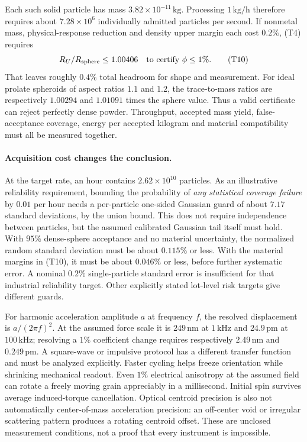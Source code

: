 \documentclass[11pt]{article}
\begin{document}
Each such solid particle has mass $3.82\times10^{-11}\,\mathrm{kg}$. Processing $1\,\mathrm{kg/h}$ therefore requires about $7.28\times10^6$ individually admitted particles per second. If nonmetal mass, physical-response reduction and density upper margin each cost $0.2\%$, (T4) requires
\[
 R_U/R_{\rm sphere}\le1.00406
 \quad\hbox{to certify }\phi\le1\%.
 \tag{T10}
\]
That leaves roughly $0.4\%$ total headroom for shape and measurement. For ideal prolate spheroids of aspect ratios $1.1$ and $1.2$, the trace-to-mass ratios are respectively $1.00294$ and $1.01091$ times the sphere value. Thus a valid certificate can reject perfectly dense powder. Throughput, accepted mass yield, false-acceptance coverage, energy per accepted kilogram and material compatibility must all be measured together.

\paragraph{Acquisition cost changes the conclusion.}
At the target rate, an hour contains $2.62\times10^{10}$ particles. As an illustrative reliability requirement, bounding the probability of \emph{any statistical coverage failure} by $0.01$ per hour needs a per-particle one-sided Gaussian guard of about $7.17$ standard deviations, by the union bound. This does not require independence between particles, but the assumed calibrated Gaussian tail itself must hold. With $95\%$ dense-sphere acceptance and no material uncertainty, the normalized random standard deviation must be about $0.115\%$ or less. With the material margins in (T10), it must be about $0.046\%$ or less, before further systematic error. A nominal $0.2\%$ single-particle standard error is insufficient for that industrial reliability target. Other explicitly stated lot-level risk targets give different guards.

For harmonic acceleration amplitude $a$ at frequency $f$, the resolved displacement is $a/(2\pi f)^2$. At the assumed force scale it is $249\,\mathrm{nm}$ at $1\,\mathrm{kHz}$ and $24.9\,\mathrm{pm}$ at $100\,\mathrm{kHz}$; resolving a $1\%$ coefficient change requires respectively $2.49\,\mathrm{nm}$ and $0.249\,\mathrm{pm}$. A square-wave or impulsive protocol has a different transfer function and must be analyzed explicitly. Faster cycling helps freeze orientation while shrinking mechanical readout. Even $1\%$ electrical anisotropy at the assumed field can rotate a freely moving grain appreciably in a millisecond. Initial spin survives average induced-torque cancellation. Optical centroid precision is also not automatically center-of-mass acceleration precision: an off-center void or irregular scattering pattern produces a rotating centroid offset. These are unclosed measurement conditions, not a proof that every instrument is impossible.
\end{document}
